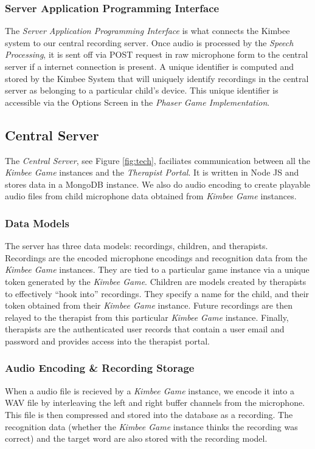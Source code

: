 \documentclass{sig-alternate-2013}
\begin{document}
\subsubsection{Server Application Programming Interface}
The {\em Server Application Programming Interface} is what connects the Kimbee system to our central recording server. Once audio is processed by the {\em Speech Processing}, it is sent off via POST request in raw microphone form to the central server if a internet connection is present. A unique identifier is computed and stored by the Kimbee System that will uniquely identify recordings in the central server as belonging to a particular child's device. This unique identifier is accessible via the Options Screen in the {\em Phaser Game Implementation}.

\subsection{Central Server}
The {\em Central Server}, see Figure \ref{fig:tech}, faciliates communication between all the {\em Kimbee Game} instances and the {\em Therapist Portal}. It is written in Node JS and stores data in a MongoDB instance. We also do audio encoding to create playable audio files from child microphone data obtained from {\em Kimbee Game} instances.

\subsubsection{Data Models}
  The server has three data models: recordings, children, and therapists. Recordings are the encoded microphone encodings and recognition data from the {\em Kimbee Game} instances. They are tied to a particular game instance via a unique token generated by the {\em Kimbee Game}. Children are models created by therapists to effectively ``hook into'' recordings. They specify a name for the child, and their token obtained from their {\em Kimbee Game} instance. Future recordings are then relayed to the therapist from this particular {\em Kimbee Game} instance. Finally, therapists are the authenticated user records that contain a user email and password and provides access into the therapist portal.

\subsubsection{Audio Encoding \& Recording Storage}
  When a audio file is recieved by a {\em Kimbee Game} instance, we encode it into a WAV file by interleaving the left and right buffer channels from the microphone. This file is then compressed and stored into the database as a recording. The recognition data (whether the {\em Kimbee Game} instance thinks the recording was correct) and the target word are also stored with the recording model.
\end{document}
